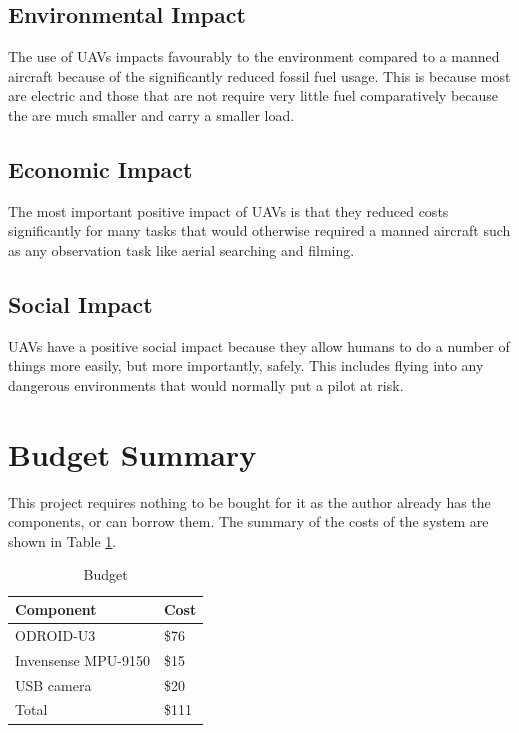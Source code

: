 \documentclass[a4paper,12pt]{article}
\begin{document}
\subsection{Environmental Impact}
The use of UAVs impacts favourably to the environment compared to a manned aircraft because of the significantly reduced fossil fuel usage. This is because most are electric and those that are not require very little fuel comparatively because the are much smaller and carry a smaller load.

\subsection{Economic Impact}
The most important positive impact of UAVs is that they reduced costs significantly for many tasks that would otherwise required a manned aircraft such as any observation task like aerial searching and filming.

\subsection{Social Impact}
UAVs have a positive social impact because they allow humans to do a number of things more easily, but more importantly, safely. This includes flying into any dangerous environments that would normally put a pilot at risk.

\section{Budget Summary}
This project requires nothing to be bought for it as the author already has the components, or can borrow them. The summary of the costs of the system are shown in Table \ref{tab:budget}.
\begin{table}[h]
	\centering
	\begin{tabular}{| l | l |}

	\hline
	Component & Cost \\
	\hline \hline
	ODROID-U3 & \$76 \\
	\hline
	Invensense MPU-9150 & \$15 \\
	\hline
	USB camera & \$20 \\
	\hline \hline
	Total & \$111 \\ 
	\hline
	\end{tabular}
	\label{tab:budget}
	\caption{Budget}
\end{table}




\end{document}
